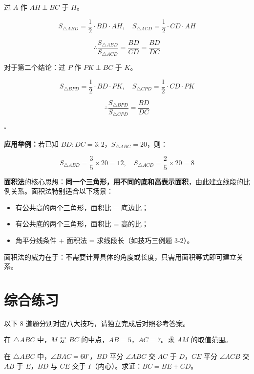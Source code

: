 \documentclass[12pt, a4paper]{ctexart}
\begin{document}
过 \(A\) 作 \(AH \perp BC\) 于 \(H\)。

\[S_{\triangle ABD} = \frac{1}{2} \cdot BD \cdot AH, \quad S_{\triangle ACD} = \frac{1}{2} \cdot CD \cdot AH\]

\[\therefore \frac{S_{\triangle ABD}}{S_{\triangle ACD}} = \frac{BD}{CD} = \frac{BD}{DC}\]

对于第二个结论：过 \(P\) 作 \(PK \perp BC\) 于 \(K\)。

\[S_{\triangle BPD} = \frac{1}{2} \cdot BD \cdot PK, \quad S_{\triangle CPD} = \frac{1}{2} \cdot CD \cdot PK\]

\[\therefore \frac{S_{\triangle BPD}}{S_{\triangle CPD}} = \frac{BD}{DC}\]

\hfill\(\square\)

\medskip
\textbf{应用举例：}若已知 \(BD:DC = 3:2\)，\(S_{\triangle ABC} = 20\)，则：

\[S_{\triangle ABD} = \frac{3}{5} \times 20 = 12, \quad S_{\triangle ACD} = \frac{2}{5} \times 20 = 8\]

\begin{tipbox}[方法总结]
\textbf{面积法}的核心思想：\textbf{同一个三角形，用不同的底和高表示面积}，由此建立线段的比例关系。面积法特别适合以下场景：
\begin{itemize}[leftmargin=1.5em]
  \item 有公共高的两个三角形，面积比 = 底边比；
  \item 有公共底的两个三角形，面积比 = 高的比；
  \item 角平分线条件 + 面积法 = 求线段长（如技巧三例题 3-2）。
\end{itemize}
面积法的威力在于：不需要计算具体的角度或长度，只需用面积等式即可建立关系。
\end{tipbox}

\newpage
\section*{\textcolor{mainblue}{综合练习}}

\noindent 以下 8 道题分别对应八大技巧，请独立完成后对照参考答案。

\begin{exerbox}[【第 1 题】倍长中线法]
在 \(\triangle ABC\) 中，\(M\) 是 \(BC\) 的中点，\(AB = 5\)，\(AC = 7\)。求 \(AM\) 的取值范围。
\end{exerbox}

\begin{exerbox}[【第 2 题】截长补短法]
在 \(\triangle ABC\) 中，\(\angle BAC = 60^\circ\)，\(BD\) 平分 \(\angle ABC\) 交 \(AC\) 于 \(D\)，\(CE\) 平分 \(\angle ACB\) 交 \(AB\) 于 \(E\)，\(BD\) 与 \(CE\) 交于 \(I\)（内心）。求证：\(BC = BE + CD\)。
\end{exerbox}
\end{document}
